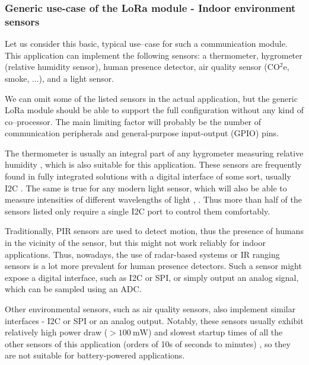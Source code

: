 \subsubsection{Generic use-case of the LoRa module - Indoor environment sensors}
Let us consider this basic, typical use--case for such a communication module. This application can implement the following sensors: a thermometer, hygrometer (relative humidity sensor), human presence detector, air quality sensor (CO$^2$e, smoke, ...), and a light sensor.

We can omit some of the listed sensors in the actual application, but the generic LoRa module should be able to support the full configuration without any kind of co--processor. The main limiting factor will probably be the number of communication peripherals and general-purpose input-output (GPIO) pins.

The thermometer is usually an integral part of any hygrometer measuring relative humidity \cite{webster_humidity_1998}, which is also suitable for this application. These sensors are frequently found in fully integrated solutions with a digital interface of some sort, usually I2C \cite{bosch_sensortec_gmbh_bst-bme280-ds002pdf_2024}. The same is true for any modern light sensor, which will also be able to measure intensities of different wavelengths of light \cite{stmicroelectronics_ambient_2024}, \cite{texas_instruments_inc_light_2024}. Thus more than half of the sensors listed only require a single I2C port to control them comfortably.

Traditionally, PIR sensors are used to detect motion, thus the presence of humans in the vicinity of the sensor, but this might not work reliably for indoor applications. Thus, nowadays, the use of radar-based systems \cite{infineon_technologies_presence_2024} or IR ranging sensors \cite{stmicroelectronics_human_2024} is a lot more prevalent for human presence detectors. Such a sensor might expose a digital interface, such as I2C or SPI, or simply output an analog signal, which can be sampled using an ADC.

Other environmental sensors, such as air quality sensors, also implement similar interfaces - I2C or SPI or an analog output. Notably, these sensors usually exhibit relatively high power draw ($>100~\mathrm{mW}$) and slowest startup times of all the other sensors of this application (orders of 10s of seconds to minutes) \cite{amphenol_inc_mics-vz-89te_2024}, so they are not suitable for battery-powered applications.

